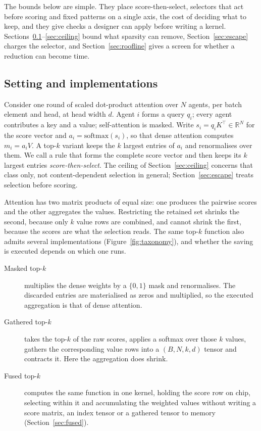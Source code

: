 The bounds below are simple. They place score-then-select, selectors that act
before scoring and fixed patterns on a single axis, the cost of deciding what to
keep, and they give checks a designer can apply before writing a kernel.
Sections~\ref{sec:setting}--\ref{sec:ceiling} bound what sparsity can remove,
Section~\ref{sec:escape} charges the selector, and Section~\ref{sec:roofline}
gives a screen for whether a reduction can become time.

\subsection{Setting and implementations}
\label{sec:setting}

Consider one round of scaled dot-product attention over $N$ agents, per batch
element and head, at head width $d$. Agent $i$ forms a query $q_i$; every agent
contributes a key and a value; self-attention is masked. Write
$s_i = q_i K^\top \in \mathbb{R}^N$ for the score vector and
$a_i = \mathrm{softmax}(s_i)$, so that dense attention computes $m_i = a_i V$. A
top-$k$ variant keeps the $k$ largest entries of $a_i$ and renormalises over
them. We call a rule that forms the complete score vector and then keeps its
$k$ largest entries \emph{score-then-select}. The ceiling of
Section~\ref{sec:ceiling} concerns that class only, not content-dependent
selection in general; Section~\ref{sec:escape} treats selection before scoring.

Attention has two matrix products of equal size: one produces the pairwise
scores and the other aggregates the values. Restricting the retained set shrinks
the second, because only $k$ value rows are combined, and cannot shrink the
first, because the scores are what the selection reads. The same top-$k$
function also admits several implementations (Figure~\ref{fig:taxonomy}), and
whether the saving is executed depends on which one runs.

\begin{description}
  \item[Masked top-$k$] multiplies the dense weights by a $\{0,1\}$ mask and
    renormalises. The discarded entries are materialised as zeros and
    multiplied, so the executed aggregation is that of dense attention.
  \item[Gathered top-$k$] takes the top-$k$ of the raw scores, applies a
    softmax over those $k$ values, gathers the corresponding value rows into a
    $(B,N,k,d)$ tensor and contracts it. Here the aggregation does shrink.
  \item[Fused top-$k$] computes the same function in one kernel, holding the
    score row on chip, selecting within it and accumulating the weighted values
    without writing a score matrix, an index tensor or a gathered tensor to
    memory (Section~\ref{sec:fused}).
\end{description}

